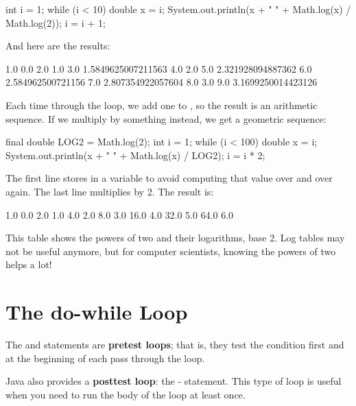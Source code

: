 \begin{code}
int i = 1;
while (i < 10) {
    double x = i;
    System.out.println(x + "   " + Math.log(x) / Math.log(2));
    i = i + 1;
}
\end{code}

And here are the results:

\begin{stdout}
1.0   0.0
2.0   1.0
3.0   1.5849625007211563
4.0   2.0
5.0   2.321928094887362
6.0   2.584962500721156
7.0   2.807354922057604
8.0   3.0
9.0   3.1699250014423126
\end{stdout}

Each time through the loop, we add one to , so the result is an arithmetic sequence.
If we multiply  by something instead, we get a geometric sequence:

\begin{code}
final double LOG2 = Math.log(2);
int i = 1;
while (i < 100) {
    double x = i;
    System.out.println(x + "   " + Math.log(x) / LOG2);
    i = i * 2;
}
\end{code}


The first line stores  in a  variable to avoid computing that value over and over again.
The last line multiplies  by 2.
The result is:

\begin{stdout}
1.0   0.0
2.0   1.0
4.0   2.0
8.0   3.0
16.0   4.0
32.0   5.0
64.0   6.0
\end{stdout}

This table shows the powers of two and their logarithms, base 2.
Log tables may not be useful anymore, but for computer scientists, knowing the powers of two helps a lot!


\section{The do-while Loop}


The  and  statements are {\bf pretest loops}; that is, they test the condition first and at the beginning of each pass through the loop.


Java also provides a {\bf posttest loop}: the - statement.
This type of loop is useful when you need to run the body of the loop at least once.

